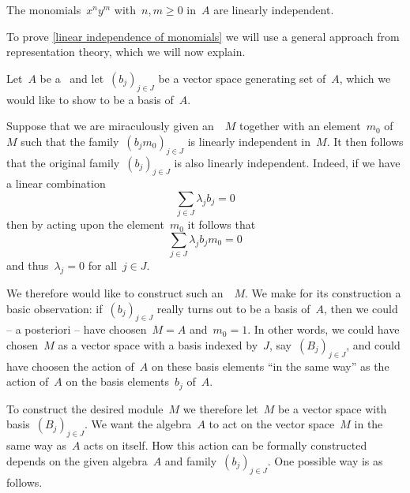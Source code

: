 	
\begin{lemma}
	\label{linear independence of monomials}
	The monomials~$x^n y^m$ with~$n, m \geq 0$ in~$A$ are linearly independent.
\end{lemma}


\begin{fluff}
	To prove \cref{linear independence of monomials} we will use a general approach from representation theory, which we will now explain.
\end{fluff}


\begin{construction}
	\label{representation theory trick to construct a basis}
	Let~$A$ be a~\algebra{$\kf$} and let~$(b_j)_{j \in J}$ be a vector space generating set of~$A$, which we would like to show to be a basis of~$A$.

	Suppose that we are miraculously given an~~$M$ together with an element~$m_0$ of~$M$ such that the family~$(b_j m_0)_{j \in J}$ is linearly independent in~$M$.
	It then follows that the original family~$(b_j)_{j \in J}$ is also linearly independent.
	Indeed, if we have a linear combination
	\[
		\sum_{j \in J} \lambda_j b_j = 0
	\]
	then by acting upon the element~$m_0$ it follows that
	\[
		\sum_{j \in J} \lambda_j b_j m_0 = 0
	\]
	and thus~$\lambda_j = 0$ for all~$j \in J$.

	We therefore would like to construct such an~~$M$.
	We make for its construction a basic observation:
	if~$(b_j)_{j \in J}$ really turns out to be a basis of~$A$, then we could -- a posteriori -- have choosen~$M = A$ and~$m_0 = 1$.
	In other words, we could have chosen~$M$ as a vector space with a basis indexed by~$J$, say~$(B_j)_{j \in J}$, and could have choosen the action of~$A$ on these basis elements \enquote{in the same way} as the action of~$A$ on the basis elements~$b_j$ of~$A$.

	To construct the desired module~$M$ we therefore let~$M$ be a vector space with basis~$(B_j)_{j \in J}$.
	We want the algebra~$A$ to act on the vector space~$M$ in the same way as~$A$ acts on itself.
	How this action can be formally constructed depends on the given algebra~$A$ and family~$(b_j)_{j \in J}$.
	One possible way is as follows.


\end{construction}
